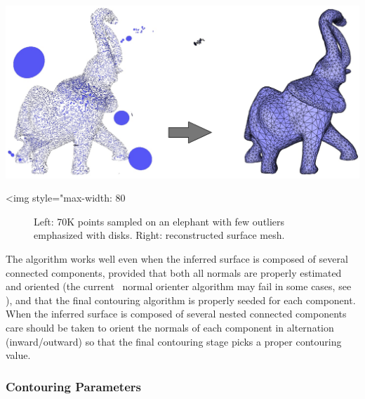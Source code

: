 \begin{center}
    \begin{ccTexOnly}
        \includegraphics[width=1.0\textwidth]{Surface_reconstruction_points_3/outliers} %
    \end{ccTexOnly}
    \begin{ccHtmlOnly}
        <img style="max-width: 80%
    \end{ccHtmlOnly}
    \begin{figure}[h]
        \caption{Left: 70K points sampled on an elephant with few
                 outliers emphasized with disks.
                 Right: reconstructed surface mesh.}
        \label{Surface_reconstruction_points_3-fig-outliers}
    \end{figure}
\end{center}


The algorithm works well even when the inferred surface is composed of several connected components, provided that both all normals are properly estimated and oriented (the current \cgal\ normal orienter algorithm may fail in some cases, see ), and that the final contouring algorithm is properly seeded for each component. When the inferred surface is composed of several nested connected components care should be taken to orient the normals of each component in alternation (inward/outward) so that the final contouring stage picks a proper contouring value.


\subsubsection{Contouring Parameters}

